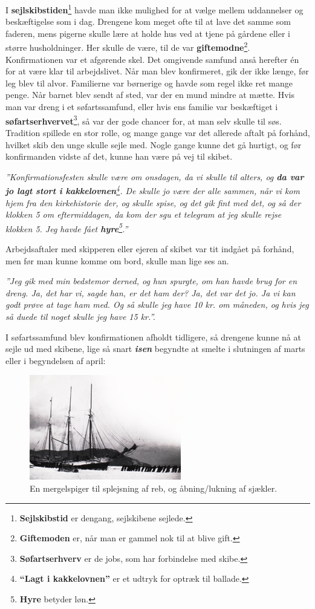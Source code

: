 I \textbf{sejlskibstiden}\footnote{\textbf{Sejlskibstid} er dengang,
  sejlskibene sejlede.} havde man ikke mulighed for at vælge mellem
uddannelser og beskæftigelse som i dag. Drengene kom meget ofte til at
lave det samme som faderen, mens pigerne skulle lære at holde hus ved at
tjene på gårdene eller i større husholdninger. Her skulle de være, til
de var \textbf{giftemodne}\footnote{\textbf{Giftemoden} er, når man er
  gammel nok til at blive gift.}. Konfirmationen var et afgørende skel.
Det omgivende samfund anså herefter én for at være klar til
arbejdslivet. Når man blev konfirmeret, gik der ikke længe, før leg blev
til alvor. Familierne var børnerige og havde som regel ikke ret mange
penge. Når barnet blev sendt af sted, var der en mund mindre at mætte.
Hvis man var dreng i et søfartssamfund, eller hvis ens familie var
beskæftiget i \textbf{søfartserhvervet}\footnote{\textbf{Søfartserhverv}
  er de jobs, som har forbindelse med skibe.}, så var der gode chancer
for, at man selv skulle til søs. Tradition spillede en stor rolle, og
mange gange var det allerede aftalt på forhånd, hvilket skib den unge
skulle sejle med. Nogle gange kunne det gå hurtigt, og før konfirmanden
vidste af det, kunne han være på vej til skibet.

\emph{''Konfirmationsfesten skulle være om onsdagen, da vi skulle til
alters, og \textbf{da var jo lagt stort i kakkelovnen}\footnote{\textbf{``Lagt
  i kakkelovnen''} er et udtryk for optræk til ballade.}. De skulle jo
være der alle sammen, når vi kom hjem fra den kirkehistorie der, og
skulle spise, og det gik fint med det, og så der klokken 5 om
eftermiddagen, da kom der sgu et telegram at jeg skulle rejse klokken 5.
Jeg havde fået \textbf{hyre}\footnote{\textbf{Hyre} betyder løn.}.''}

Arbejdsaftaler med skipperen eller ejeren af skibet var tit indgået på
forhånd, men før man kunne komme om bord, skulle man lige ses an.

\emph{''Jeg gik med min bedstemor derned, og hun spurgte, om han havde
brug for en dreng. Ja, det har vi, sagde han, er det ham der? Ja, det
var det jo. Ja vi kan godt prøve at tage ham med. Og så skulle jeg have
10 kr. om måneden, og hvis jeg så duede til noget skulle jeg have 15
kr.''.}

I søfartssamfund blev konfirmationen afholdt tidligere, så drengene
kunne nå at sejle ud med skibene, lige så snart \textbf{\emph{isen}}
begyndte at smelte i slutningen af marts eller i begyndelsen af april:

\begin{figure}
\centering
\includegraphics{images/sejlskibe_tema-2-isen.jpg}
\caption{En mergelspiger til splejsning af reb, og åbning/lukning af
sjækler.}
\end{figure}

